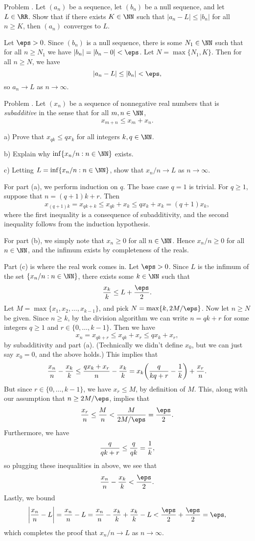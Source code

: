 \proclaim Problem \advthm. Let $(a_n)$ be a sequence, let $(b_n)$ be a null sequence, and let $L\in\RR$.
Show that if there exists $K\in \NN$ such that $|a_n - L|\le |b_n|$ for all $n\ge K$,
then $(a_n)$ converges to $L$.

\proof Let $\eps > 0$. Since $(b_n)$ is a null sequence, there is some $N_1\in \NN$
such that for all $n\ge N_1$ we have $|b_n| = |b_n - 0| < \eps$. Let $N = \max\{N_1, K\}$.
Then for all $n\ge N$, we have
$$|a_n - L|\le |b_n| <\eps,$$
so $a_n\to L$ as $n\to\infty$.\slug
\goodbreak

\proclaim Problem \advthm. Let $(x_n)$ be a sequence of nonnegative real numbers that is
{\it subadditive} in the sense that for all $m,n\in \NN$,
$$x_{m+n} \le x_m + x_n.$$
\medskip
\item{a)} Prove that $x_{qk} \le qx_k$ for all integers $k,q\in \NN$.
\smallskip
\item{b)} Explain why $\inf\{ x_n / n : n\in \NN\}$ exists.
\smallskip
\item{c)} Letting $L = \inf\{x_n/ n : n\in \NN\}$, show that $x_n/n \to L$ as $n\to\infty$.
\medskip

\proof For part (a), we perform induction on $q$. The base case $q=1$ is trivial. For $q\ge 1$,
suppose that $n=(q+1)k+r$. Then
$$x_{(q+1)k} = x_{qk + k} \le x_{qk} + x_k \le qx_k + x_k = (q+1)x_k,$$
where the first inequality is a consequence of subadditivity, and the second inequality follows
from the induction hypothesis.

For part (b), we simply note that $x_n\ge 0$ for all $n\in\NN$. Hence $x_n/n\ge 0$ for all $n\in \NN$,
and the infimum exists by completeness of the reals.

Part (c) is where the real work comes in. Let $\eps > 0$.
Since $L$ is the infimum of the set $\{x_n/n : n\in \NN\}$, there exists some $k\in \NN$ such that
$${x_k\over k} \le L+{\eps\over 2}.$$
Let $M = \max\{x_1,x_2,\ldots,x_{k-1}\}$, and pick $N= \max\{k, 2M/\eps\}$. Now let $n\ge N$ be given.
Since $n\ge k$, by the division algorithm we can write $n = qk+r$ for some integers $q\ge 1$ and
$r\in \{0,\ldots,k-1\}$. Then we have
$$x_n = x_{qk+r} \le x_{qk} + x_r \le qx_k + x_r,$$
by subadditivity and part (a). (Technically we didn't define $x_0$, but we can just say $x_0 = 0$,
and the above holds.) This implies that
$${x_n \over n} - {x_k\over k}
\le {qx_k + x_r\over n} - {x_k\over k}
= x_k \biggl({q\over kq+r}-{1\over k}\biggr) + {x_r\over n}.
$$
But since $r\in \{0,\ldots,k-1\}$, we have $x_r \le M$, by definition of $M$. This,
along with our assumption that $n\ge 2M/\eps$, implies that
$${x_r\over n} \le {M\over n} < {M\over 2M/\eps} = {\eps\over 2}.$$
Furthermore, we have
$${q\over qk+r} \le {q\over qk} = {1\over k},$$
so plugging these inequalities in above, we see that
$${x_n\over n} - {x_k\over k} < {\eps\over 2}.$$
Lastly, we bound
$$
\biggl| {x_n\over n} - L\biggr| = {x_n\over n} - L
= {x_n\over n} - {x_k\over k} + {x_k\over k} - L
< {\eps\over 2} + {\eps\over 2}
= \eps,$$
which completes the proof that $x_n/n\to L$ as $n\to\infty$.




\bye
